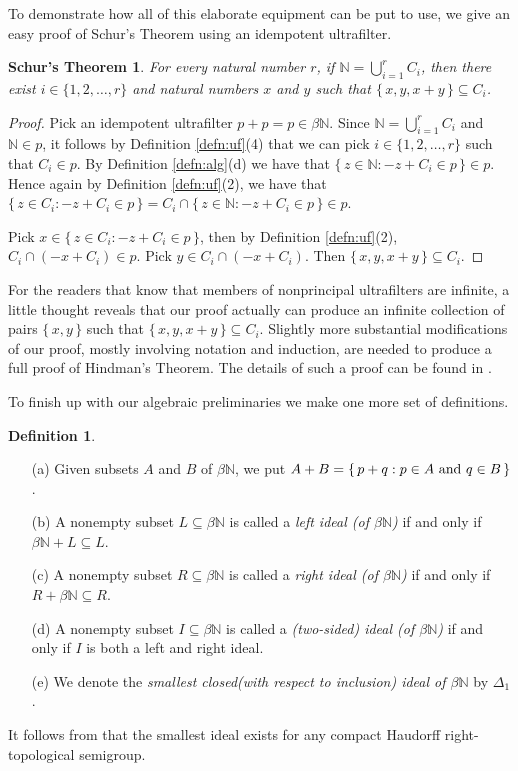 \documentclass[12pt]{article}
\theoremstyle{plain}
\newtheorem{schur}[thm]{Schur's Theorem}
\theoremstyle{definition}
\newtheorem{defn}[thm]{Definition}
\newcommand{\bbN}{\mathbb{N}}
\begin{document}
To demonstrate how all of this elaborate equipment can be put to use,
we give an easy proof of Schur's Theorem using an idempotent ultrafilter.

  \begin{schur}
    For every natural number $r$, if  \/ $\bbN = \bigcup_{i=1}^r C_i$,
    then there exist $i \in \{1, 2, \ldots, r\}$ and natural numbers
    $x$ and $y$ such that $\{\, x, y, x+y \,\} \subseteq C_i$.
  \end{schur}
  \begin{proof}
    Pick an idempotent ultrafilter $p + p = p \in \beta\bbN$. 
    Since $\bbN = \bigcup_{i=1}^r C_i$ and $\bbN \in p$, it follows by
    Definition \ref{defn:uf}(4) that we can pick $i \in \{1, 2, \ldots,
    r\}$ such that $C_i \in p$. 
    By Definition \ref{defn:alg}(d) we have that $\{\, z \in \bbN : -z
    + C_i \in p \,\} \in p$.
    Hence again by Definition \ref{defn:uf}(2), we have that $\{\, z \in
    C_i : -z + C_i \in p \,\} = C_i \cap
    \{\, z \in \bbN : -z + C_i \in p \,\} \in p$.

    Pick $x \in \{\,z \in C_i: -z + C_i \in p \,\}$, then by
    Definition \ref{defn:uf}(2), $C_i \cap (-x+C_i) \in p$.
    Pick $y \in C_i \cap (-x+C_i)$.
    Then $\{\, x, y, x+y\,\} \subseteq C_i$.
  \end{proof}
For the readers that know that members of nonprincipal ultrafilters
are infinite, a little thought reveals that our proof actually can
produce an infinite collection of pairs $\{\,x,y\,\}$ such that
$\{\,x, y, x+y \,\} \subseteq C_i$. 
Slightly more substantial modifications of our proof, mostly involving
notation and induction, are needed to produce a full proof of
Hindman's Theorem. 
The details of such a proof can be found in \cite[Theorem
5.8]{Hindman:1998fk}.

To finish up with our algebraic preliminaries we make one more
set of definitions.
  \begin{defn}
    \begin{itemize}
      \item[(a)] Given subsets $A$ and $B$ of $\beta\bbN$, we put $A +
        B = \{\, p+q : \hbox{$p \in A$ and $q \in B$} \,\}$.
      \item[(b)] A nonempty subset $L \subseteq \beta\bbN$ is called a
        \textsl{left ideal (of $\beta\bbN$)} if and only if $\beta\bbN
        + L \subseteq L$.
      \item[(c)] A nonempty subset $R \subseteq \beta\bbN$ is called a
        \textsl{right ideal (of $\beta\bbN$)} if and only if $R +
        \beta\bbN \subseteq R$.
      \item[(d)] A nonempty subset $I \subseteq \beta\bbN$ is called a
        \textsl{(two-sided) ideal (of $\beta\bbN$)} if and only if $I$
        is both a left and right ideal.
      \item[(e)] We denote the \textsl{smallest closed(with respect to
          inclusion) ideal of $\beta\bbN$} by $\Delta_1$.
    \end{itemize}
  \end{defn}
It follows from \cite[Theorem 2.8]{Hindman:1998fk} that the smallest ideal
exists for any compact Haudorff right-topological semigroup. 
\end{document}
